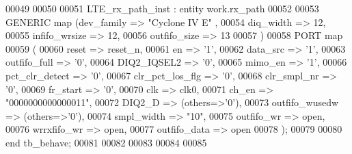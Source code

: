 \begin{DoxyCode}
00049     
00050   
00051   LTE\_rx\_path\_inst : \textcolor{keywordflow}{entity} work.rx_path 
00052 
00053 \textcolor{keywordflow}{GENERIC} \textcolor{keywordflow}{map} (dev_family => \textcolor{keyword}{"Cyclone IV E"}  ,
00054         diq_width => \textcolor{vhdllogic}{12},
00055         infifo_wrsize => \textcolor{vhdllogic}{12},
00056         outfifo_size => \textcolor{vhdllogic}{13}
00057         \textcolor{vhdlchar}{)}
00058     \textcolor{keywordflow}{PORT} \textcolor{keywordflow}{map}
00059     (
00060         reset           => reset_n,
00061         en              => '1',
00062         data_src        => '1',
00063         outfifo_full    => '0',
00064         DIQ2_IQSEL2     => '0',
00065         mimo_en             => '1',
00066         pct_clr_detect => '0',
00067         clr\_pct\_los\_flg => '0',
00068         clr_smpl_nr     => '0',
00069         fr_start            => '0',
00070         clk             => clk0,
00071         ch_en           => "\textcolor{vhdllogic}{0000000000000011}",
00072         DIQ2\_D          => \textcolor{vhdlchar}{(}\textcolor{keywordflow}{others}=>'0'\textcolor{vhdlchar}{)},
00073         outfifo\_wusedw => \textcolor{vhdlchar}{(}\textcolor{keywordflow}{others}=>'0'\textcolor{vhdlchar}{)},
00074         smpl_width      => "\textcolor{vhdllogic}{10}",
00075         outfifo_wr      => \textcolor{keywordflow}{open},
00076         wrrxfifo_wr     => \textcolor{keywordflow}{open},
00077         outfifo_data    => \textcolor{keywordflow}{open}
00078     \textcolor{vhdlchar}{)};
00079     
00080     \textcolor{keywordflow}{end} \textcolor{vhdlchar}{tb\_behave};
00081   
00082   
00083 
00084 
00085   
\end{DoxyCode}
